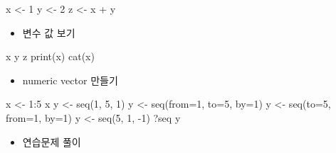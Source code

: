 \documentclass[
]{book}
\newenvironment{Shaded}{\begin{snugshade}}{\end{snugshade}}
\newcommand{\AttributeTok}[1]{\textcolor[rgb]{0.77,0.63,0.00}{#1}}
\newcommand{\DecValTok}[1]{\textcolor[rgb]{0.00,0.00,0.81}{#1}}
\newcommand{\FunctionTok}[1]{\textcolor[rgb]{0.00,0.00,0.00}{#1}}
\newcommand{\NormalTok}[1]{#1}
\newcommand{\OtherTok}[1]{\textcolor[rgb]{0.56,0.35,0.01}{#1}}
\newcommand{\SpecialCharTok}[1]{\textcolor[rgb]{0.00,0.00,0.00}{#1}}
\providecommand{\tightlist}{%
  \setlength{\itemsep}{0pt}\setlength{\parskip}{0pt}}
\begin{document}
\begin{Shaded}
\begin{Highlighting}[]
\NormalTok{x }\OtherTok{\textless{}{-}} \DecValTok{1}
\NormalTok{y }\OtherTok{\textless{}{-}} \DecValTok{2}
\NormalTok{z }\OtherTok{\textless{}{-}}\NormalTok{ x }\SpecialCharTok{+}\NormalTok{ y}
\end{Highlighting}
\end{Shaded}

\begin{itemize}
\tightlist
\item
  변수 값 보기
\end{itemize}

\begin{Shaded}
\begin{Highlighting}[]
\NormalTok{x}
\NormalTok{y}
\NormalTok{z}
\FunctionTok{print}\NormalTok{(x)}
\FunctionTok{cat}\NormalTok{(x)}
\end{Highlighting}
\end{Shaded}

\begin{itemize}
\tightlist
\item
  numeric vector 만들기
\end{itemize}

\begin{Shaded}
\begin{Highlighting}[]
\NormalTok{x }\OtherTok{\textless{}{-}} \DecValTok{1}\SpecialCharTok{:}\DecValTok{5}
\NormalTok{x}
\NormalTok{y }\OtherTok{\textless{}{-}} \FunctionTok{seq}\NormalTok{(}\DecValTok{1}\NormalTok{, }\DecValTok{5}\NormalTok{, }\DecValTok{1}\NormalTok{)}
\NormalTok{y }\OtherTok{\textless{}{-}} \FunctionTok{seq}\NormalTok{(}\AttributeTok{from=}\DecValTok{1}\NormalTok{, }\AttributeTok{to=}\DecValTok{5}\NormalTok{, }\AttributeTok{by=}\DecValTok{1}\NormalTok{)}
\NormalTok{y }\OtherTok{\textless{}{-}} \FunctionTok{seq}\NormalTok{(}\AttributeTok{to=}\DecValTok{5}\NormalTok{, }\AttributeTok{from=}\DecValTok{1}\NormalTok{, }\AttributeTok{by=}\DecValTok{1}\NormalTok{)}
\NormalTok{y }\OtherTok{\textless{}{-}} \FunctionTok{seq}\NormalTok{(}\DecValTok{5}\NormalTok{, }\DecValTok{1}\NormalTok{, }\SpecialCharTok{{-}}\DecValTok{1}\NormalTok{)}
\NormalTok{?seq}
\NormalTok{y}
\end{Highlighting}
\end{Shaded}

\begin{itemize}
\tightlist
\item
  연습문제 풀이
\end{itemize}
\end{document}
